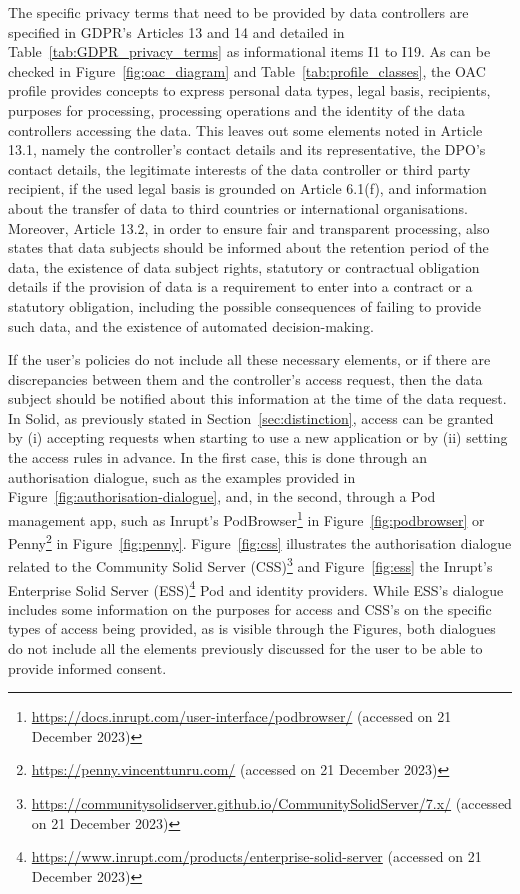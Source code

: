 The specific privacy terms that need to be provided by data controllers are specified in GDPR's Articles 13 and 14 and detailed in Table~\ref{tab:GDPR_privacy_terms} as informational items I1 to I19.
As can be checked in Figure~\ref{fig:oac_diagram} and Table~\ref{tab:profile_classes}, the OAC profile provides concepts to express personal data types, legal basis, recipients, purposes for processing, processing operations and the identity of the data controllers accessing the data. 
This leaves out some elements noted in Article 13.1, namely the controller's contact details and its representative, the DPO's contact details, the legitimate interests of the data controller or third party recipient, if the used legal basis is grounded on Article 6.1(f), and information about the transfer of data to third countries or international organisations.
Moreover, Article 13.2, in order to ensure fair and transparent processing, also states that data subjects should be informed about the retention period of the data, the existence of data subject rights, statutory or contractual obligation details if the provision of data is a requirement to enter into a contract or a statutory obligation, including the possible consequences of failing to provide such data, and the existence of automated decision-making.

If the user's policies do not include all these necessary elements, or if there are discrepancies between them and the controller's access request, then the data subject should be notified about this information at the time of the data request.
In Solid, as previously stated in Section~\ref{sec:distinction}, access can be granted by (i) accepting requests when starting to use a new application or by (ii) setting the access rules in advance.
In the first case, this is done through an authorisation dialogue, such as the examples provided in Figure~\ref{fig:authorisation-dialogue}, and, in the second, through a Pod management app, such as Inrupt's PodBrowser\footnote{{\url{https://docs.inrupt.com/user-interface/podbrowser/} (accessed on 21 December 2023)}} in Figure~\ref{fig:podbrowser} or Penny\footnote{{\url{https://penny.vincenttunru.com/} (accessed on 21 December 2023)}} in Figure~\ref{fig:penny}.
Figure~\ref{fig:css} illustrates the authorisation dialogue related to the Community Solid Server (CSS)\footnote{{\url{https://communitysolidserver.github.io/CommunitySolidServer/7.x/} (accessed on 21 December 2023)}} and Figure~\ref{fig:ess} the Inrupt's Enterprise Solid Server (ESS)\footnote{{\url{https://www.inrupt.com/products/enterprise-solid-server} (accessed on 21 December 2023)}} Pod and identity providers.
While ESS's dialogue includes some information on the purposes for access and CSS's on the specific types of access being provided, as is visible through the Figures, both dialogues do not include all the elements previously discussed for the user to be able to provide informed consent.

